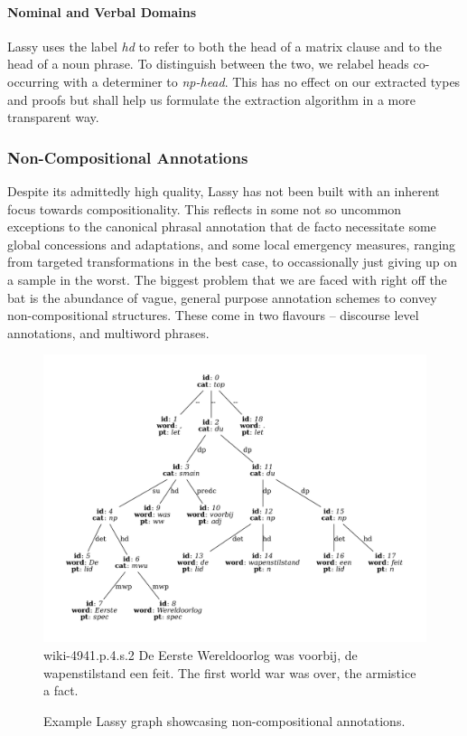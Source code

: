 \paragraph{Nominal and Verbal Domains}
Lassy uses the label \textit{hd} to refer to both the head of a matrix clause and to the head of a noun phrase.
To distinguish between the two, we relabel heads co-occurring with a determiner to \textit{np-head}.
This has no effect on our extracted types and proofs but shall help us formulate the extraction algorithm in a more transparent way.

\subsubsection{Non-Compositional Annotations}
Despite its admittedly high quality, Lassy has not been built with an inherent focus towards compositionality.
This reflects in some not so uncommon exceptions to the canonical phrasal annotation that de facto necessitate some global concessions and adaptations, and some local emergency measures, ranging from targeted transformations in the best case, to occassionally just giving up on a sample in the worst.
The biggest problem that we are faced with right off the bat is the abundance of vague, general purpose annotation schemes to convey non-compositional structures.
These come in two flavours -- discourse level annotations, and multiword phrases.

\begin{figure}
	\includegraphics[width=1\textwidth,trim={1.25cm 0 1.25cm 0}, clip]{./prebuilt/du_mwp_example.pdf}
	\lassycap
		{wiki-4941.p.4.s.2}
		{De Eerste Wereldoorlog was voorbij, de wapenstilstand een feit.}
		{The first world war was over, the armistice a fact.}
	\caption{Example Lassy graph showcasing non-compositional annotations.}
	\label{figure:du_mwp_example}
\end{figure}

